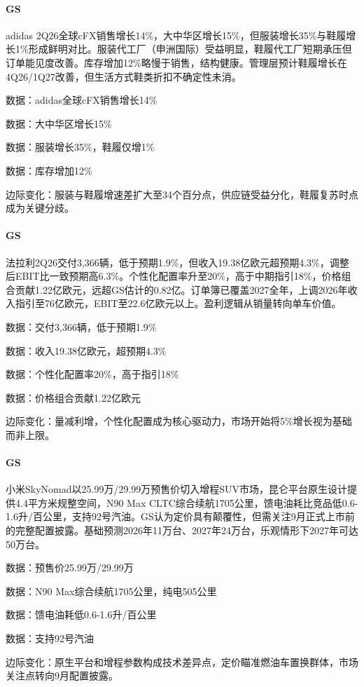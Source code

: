 \documentclass[11pt]{ctexart}
\begin{document}
\paragraph{GS} adidas 2Q26全球cFX销售增长14\%，大中华区增长15\%，但服装增长35\%与鞋履增长1\%形成鲜明对比。服装代工厂（申洲国际）受益明显，鞋履代工厂短期承压但订单能见度改善。库存增加12\%略慢于销售，结构健康。管理层预计鞋履增长在4Q26/1Q27改善，但生活方式鞋类折扣不确定性未消。
{\small\color{refgray}数据：adidas全球cFX销售增长14\%\par}
{\small\color{refgray}数据：大中华区增长15\%\par}
{\small\color{refgray}数据：服装增长35\%，鞋履仅增1\%\par}
{\small\color{refgray}数据：库存增加12\%\par}
{\small\color{refgray}边际变化：服装与鞋履增速差扩大至34个百分点，供应链受益分化，鞋履复苏时点成为关键分歧。\par}
\paragraph{GS} 法拉利2Q26交付3,366辆，低于预期1.9\%，但收入19.38亿欧元超预期4.3\%，调整后EBIT比一致预期高6.3\%。个性化配置率升至20\%，高于中期指引18\%，价格组合贡献1.22亿欧元，远超GS估计的0.82亿。订单簿已覆盖2027全年，上调2026年收入指引至76亿欧元，EBIT至22.6亿欧元以上。盈利逻辑从销量转向单车价值。
{\small\color{refgray}数据：交付3,366辆，低于预期1.9\%\par}
{\small\color{refgray}数据：收入19.38亿欧元，超预期4.3\%\par}
{\small\color{refgray}数据：个性化配置率20\%，高于指引18\%\par}
{\small\color{refgray}数据：价格组合贡献1.22亿欧元\par}
{\small\color{refgray}边际变化：量减利增，个性化配置成为核心驱动力，市场开始将5\%增长视为基础而非上限。\par}
\paragraph{GS} 小米SkyNomad以25.99万/29.99万预售价切入增程SUV市场，昆仑平台原生设计提供4.4平方米规整空间，N90 Max CLTC综合续航1705公里，馈电油耗比竞品低0.6-1.6升/百公里，支持92号汽油。GS认为定价具有颠覆性，但需关注9月正式上市前的完整配置披露。基础预测2026年11万台、2027年24万台，乐观情形下2027年可达50万台。
{\small\color{refgray}数据：预售价25.99万/29.99万\par}
{\small\color{refgray}数据：N90 Max综合续航1705公里，纯电505公里\par}
{\small\color{refgray}数据：馈电油耗低0.6-1.6升/百公里\par}
{\small\color{refgray}数据：支持92号汽油\par}
{\small\color{refgray}边际变化：原生平台和增程参数构成技术差异点，定价瞄准燃油车置换群体，市场关注点转向9月配置披露。\par}
\end{document}
